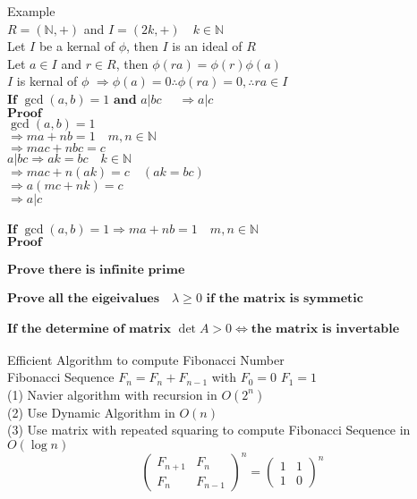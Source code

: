 \documentclass{book}
\begin{document}
Example\\
$R = (\mathbb{N}, +)$ and $I = (2k, +) \quad k \in \mathbb{N}$\\

Let $I$ be a kernal of $\phi$, then $I$ is an ideal of $R$\\
Let $a \in I$ and $r \in R$, then $\phi(ra) = \phi(r)\phi(a)$\\
$I$ is kernal of $\phi$ $\Rightarrow \phi(a) = 0 \therefore \phi(ra) = 0, \therefore ra \in I$\\

$\textbf{If }  \gcd(a, b) = 1 \textbf{ and }  a \vert bc \quad$  $\Rightarrow a \vert c$ \\
$\textbf{Proof}$ \\
$\gcd(a, b) = 1  $\\
$\Rightarrow ma+nb = 1\quad m, n \in \mathbb{N} $ \\
$\Rightarrow mac + nbc = c$ \\
$a \vert bc \Rightarrow ak = bc \quad k \in \mathbb{N} $ \\
$\Rightarrow mac + n(ak)=c \quad    (ak=bc) $ \\
$\Rightarrow a(mc + nk) = c$  \\
$\Rightarrow a \vert c $ \\
\\
$\textbf{If } \gcd(a, b) = 1 \Rightarrow ma + nb = 1 \quad m, n \in \mathbb{N}$\\
$\textbf{Proof}$\\
\\
$\textbf{Prove there is infinite prime}$\\
\\
$\textbf{Prove all the eigeivalues}\quad  \lambda \geq  0  \textbf{ if the matrix is symmetic}$\\
\\
$\textbf{If the determine of matrix } \det{A} > 0 \iff \textbf{the matrix is invertable}$\\
\\
Efficient Algorithm to compute Fibonacci Number \\
Fibonacci Sequence   
$F_{n} = F_{n} + F_{n-1}$ with $F_{0} = 0$
$F_{1} = 1$ \\
(1) Navier algorithm with recursion in $O(2^n)$ \\
(2) Use Dynamic Algorithm in $O(n)$\\
(3) Use matrix with repeated squaring to compute Fibonacci Sequence in $O(\log{n})$
\[\left(\begin{array}{cc} F_{n+1} & F_{n} \\ F_{n} & F_{n-1} \end{array} \right)^n =  \left(\begin{array}{cc}1 & 1 \\ 1 & 0 \end{array} \right)^n \]
\\
\newpage
\end{document}
